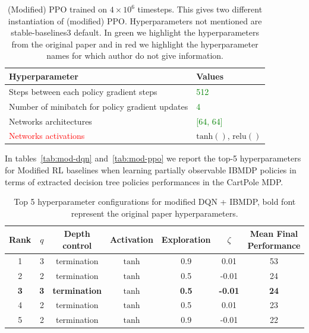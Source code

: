 \begin{table}
    \centering
    \caption{(Modified) PPO trained on $4\times10^6$ timesteps. This gives two different instantiation of (modified) PPO. Hyperparameters not mentioned are stable-baselines3 default. In green we highlight the hyperparameters from the original paper and in red we highlight the hyperparameter names for which author do not give information.}\label{tab:ibmdp-rl2}
    \begin{tabular}{ll}
    \toprule
    \textbf{Hyperparameter} & \textbf{Values}\\
    \midrule
    Steps between each policy gradient steps & \textcolor{green}{512} \\
    Number of minibatch for policy gradient updates & \textcolor{green}{4} \\
    Networks architectures & \textcolor{green}{[64, 64]}\\
    \textcolor{red}{Networks activations} & $\operatorname{tanh()}$, $\operatorname{relu()}$\\
    \bottomrule
    \end{tabular}
    \end{table}


In tables~\ref{tab:mod-dqn} and~\ref{tab:mod-ppo} we report the top-5 hyperparameters for Modified RL baselines when learning partially observable IBMDP policies in terms of extracted decision tree policies performances in the CartPole MDP.
\begin{table}
    \centering
    \caption{Top 5 hyperparameter configurations for modified DQN + IBMDP, bold font represent the original paper hyperparameters.}\label{tab:mod-dqn}
    \label{tab:top5_results}
    \begin{tabular}{ccccccc}
    \toprule
    Rank & $q$ & Depth control & Activation & Exploration & $\zeta$ & {Mean Final Performance} \\
    \midrule
    1 & 3 & termination & $\operatorname{tanh}$ & 0.9 & 0.01 & 53 \\
    2 & 2 & termination & $\operatorname{tanh}$ & 0.5 & -0.01 & 24 \\
    \textbf{3} & \textbf{3} & \textbf{termination} & $\operatorname{tanh}$ & \textbf{0.5} & \textbf{-0.01} & \textbf{24} \\
    4 & 2 & termination & $\operatorname{tanh}$ & 0.5 & 0.01 & 23 \\
    5 & 2 & termination & $\operatorname{tanh}$ & 0.9 & -0.01 & 22 \\
    \bottomrule
    \end{tabular}
    \end{table}

